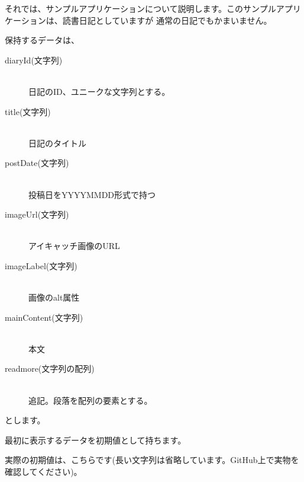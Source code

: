 それでは、サンプルアプリケーションについて説明します。このサンプルアプリケーションは、読書日記としていますが
通常の日記でもかまいません。

\vspace*{\baselineskip}

保持するデータは、

\begin{description}
\item[diaryId(文字列)] \mbox{} \\
日記のID、ユニークな文字列とする。
\item[title(文字列)] \mbox{} \\
日記のタイトル
\item[postDate(文字列)] \mbox{} \\
投稿日をYYYYMMDD形式で持つ
\item[imageUrl(文字列)] \mbox{} \\
アイキャッチ画像のURL
\item[imageLabel(文字列)] \mbox{} \\
画像のalt属性
\item[mainContent(文字列)] \mbox{} \\
本文
\item[readmore(文字列の配列)] \mbox{} \\
追記。段落を配列の要素とする。
\end{description}

とします。

\vspace*{\baselineskip}

最初に表示するデータを初期値として持ちます。

実際の初期値は、こちらです(長い文字列は省略しています。GitHub上で実物を確認してください)。

